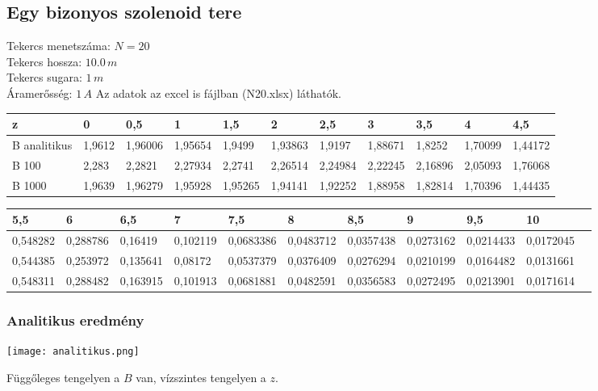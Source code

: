 \documentclass{article}
\begin{document}
\subsection{Egy bizonyos szolenoid tere}
Tekercs menetszáma: $N = 20$ \\
Tekercs hossza: $10.0 \, m$ \\
Tekercs sugara: $1 \, m$ \\
Áramerősség: $1 \, A$
\newline \newline
Az adatok az excel is fájlban (N20.xlsx) láthatók. \\
\begin{tabular}{|l|l|l|l|l|l|l|l|l|l|l|}
\hline
z            & 0      & 0,5     & 1       & 1,5     & 2       & 2,5     & 3       & 3,5     & 4       & 4,5     \\ \hline
B analitikus & 1,9612 & 1,96006 & 1,95654 & 1,9499  & 1,93863 & 1,9197  & 1,88671 & 1,8252  & 1,70099 & 1,44172 \\ \hline
B 100        & 2,283  & 2,2821  & 2,27934 & 2,2741  & 2,26514 & 2,24984 & 2,22245 & 2,16896 & 2,05093 & 1,76068 \\ \hline
B 1000       & 1,9639 & 1,96279 & 1,95928 & 1,95265 & 1,94141 & 1,92252 & 1,88958 & 1,82814 & 1,70396 & 1,44435 \\ \hline
\end{tabular}
\newline \newline
\begin{tabular}{|l|l|l|l|l|l|l|l|l|l|l|}
\hline
 5,5      & 6        & 6,5      & 7        & 7,5       & 8         & 8,5       & 9         & 9,5       & 10        \\ \hline
 0,548282 & 0,288786 & 0,16419  & 0,102119 & 0,0683386 & 0,0483712 & 0,0357438 & 0,0273162 & 0,0214433 & 0,0172045 \\ \hline
0,544385 & 0,253972 & 0,135641 & 0,08172  & 0,0537379 & 0,0376409 & 0,0276294 & 0,0210199 & 0,0164482 & 0,0131661  \\ \hline
 0,548311 & 0,288482 & 0,163915 & 0,101913 & 0,0681881 & 0,0482591 & 0,0356583 & 0,0272495 & 0,0213901 & 0,0171614 \\ \hline
\end{tabular}

\subsubsection{Analitikus eredmény}
\begin{center}
\texttt{[image: analitikus.png]}
\end{center}
Függőleges tengelyen a $B$ van, vízszintes tengelyen a $z$.
\end{document}
